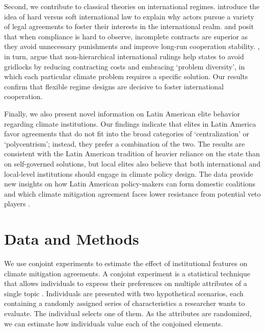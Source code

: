 \documentclass[a4paper,12pt]{article}
\begin{document}
Second, we contribute to classical theories on international regimes. \citet{abbott2000hard} introduce the idea of hard versus soft international law to explain why actors pursue a variety of legal agreements to foster their interests in the international realm. \citet{mildenberger2017beliefs} and \citet{rosendorff2001optimal} posit that when compliance is hard to observe, incomplete contracts are superior as they avoid unnecessary punishments and improve long-run cooperation stability. \citet{keohane2011regime}, in turn, argue that non-hierarchical international rulings help states to avoid gridlocks by reducing contracting costs and embracing `problem diversity', in which each particular climate problem requires a specific solution. Our results confirm that flexible regime designs are decisive to foster international cooperation.

Finally, we also present novel information on Latin American elite behavior regarding climate institutions. Our findings indicate that elites in Latin America favor agreements that do not fit into the broad categories of `centralization' or `polycentrism'; instead, they prefer a combination of the two. The results are consistent with the Latin American tradition of heavier reliance on the state than on self-governed solutions, but local elites also believe that both international and local-level institutions should engage in climate policy design. The data provide new insights on how Latin American policy-makers can form domestic coalitions and which climate mitigation agreement faces lower resistance from potential veto players \citep{beiser2019commitment, hovi2019club}.

\section{Data and Methods}%
\label{sec:data_and_methods}

We use conjoint experiments to estimate the effect of institutional features on climate mitigation agreements. A conjoint experiment is a statistical technique that allows individuals to express their preferences on multiple attributes of a single topic \citep{bansak2016economic, hainmueller2014causal}. Individuals are presented with two hypothetical scenarios, each containing a randomly assigned series of characteristics a researcher wants to evaluate. The individual selects one of them. As the attributes are randomized, we can estimate how individuals value each of the conjoined elements.
\end{document}
